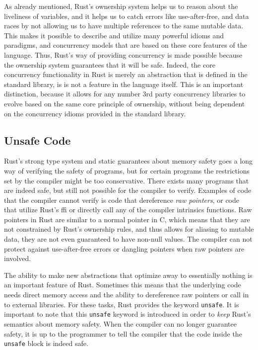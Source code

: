 As already mentioned, Rust's ownership system helps us to reason about the liveliness of variables, and it helps us to catch errors like use-after-free, and data races by not allowing us to have multiple references to the same mutable data.
This makes it possible to describe and utilize many powerful idioms and paradigms, and concurrency models that are based on these core features of the language.
Thus, Rust's way of providing concurrency is made possible because the ownership system guarantees that it will be safe.
Indeed, the core concurrency functionality in Rust is merely an abstraction that is defined in the standard library, is is not a feature in the language itself.
This is an important distinction, because it allows for any number 3rd party concurrency libraries to evolve based on the same core principle of ownership, without being dependent on the concurrency idioms provided in the standard library.

\subsection{Unsafe Code} %
\label{ssub:unsafe_code}

Rust's strong type system and static guarantees about memory safety goes a long way of verifying the safety of programs, but for certain programs the restrictions set by the compiler might be too conservative.
There exists many programs that are indeed safe, but still not possible for the compiler to verify.
Examples of code that the compiler cannot verify is code that dereference \emph{raw pointers}, or code that utilize Rust's \gls{ffi} or directly call any of the compiler intrinsics functions.
Raw pointers in Rust are similar to a normal pointer in C, which means that they are not constrained by Rust's ownership rules, and thus allows for aliasing to mutable data, they are not even guaranteed to have non-null values.
The compiler can not protect against use-after-free errors or dangling pointers when raw pointers are involved.

The ability to make new abstractions that optimize away to essentially nothing is an important feature of Rust.
Sometimes this means that the underlying code needs direct memory access and the ability to dereference raw pointers or call in to external libraries.
For these tasks, Rust provides the keyword \texttt{unsafe}.
It is important to note that this \texttt{unsafe} keyword is introduced in order to \emph{keep} Rust's semantics about memory safety.
When the compiler can no longer guarantee safety, it is up to the programmer to tell the compiler that the code inside the \texttt{unsafe} block is indeed safe.

